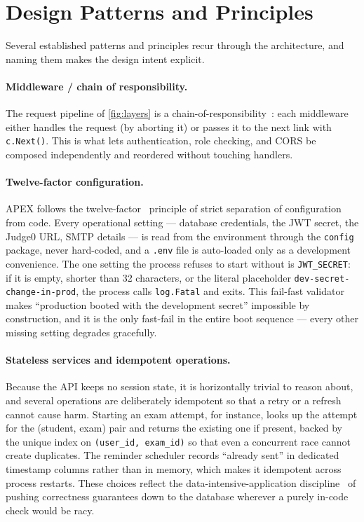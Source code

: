 \section{Design Patterns and Principles}\label{sec:patterns}

Several established patterns and principles recur through the architecture, and
naming them makes the design intent explicit.

\paragraph{Middleware / chain of responsibility.} The request pipeline of
\cref{fig:layers} is a chain-of-responsibility~\cite{fowler2002patterns}: each
middleware either handles the request (by aborting it) or passes it to the next
link with \texttt{c.Next()}. This is what lets authentication, role checking,
and CORS be composed independently and reordered without touching handlers.

\paragraph{Twelve-factor configuration.} APEX follows the
twelve-factor~\cite{twelvefactor} principle of strict separation of
configuration from code. Every operational setting --- database credentials,
the JWT secret, the Judge0 URL, SMTP details --- is read from the environment
through the \texttt{config} package, never hard-coded, and a \texttt{.env} file
is auto-loaded only as a development convenience. The one setting the process
refuses to start without is \texttt{JWT\_SECRET}: if it is empty, shorter than
32 characters, or the literal placeholder \texttt{dev-secret-change-in-prod},
the process calls \texttt{log.Fatal} and exits. This fail-fast validator makes
``production booted with the development secret'' impossible by construction,
and it is the only fast-fail in the entire boot sequence --- every other missing
setting degrades gracefully.

\paragraph{Stateless services and idempotent operations.} Because the API keeps
no session state, it is horizontally trivial to reason about, and several
operations are deliberately idempotent so that a retry or a refresh cannot cause
harm. Starting an exam attempt, for instance, looks up the attempt for the
(student, exam) pair and returns the existing one if present, backed by the
unique index on \texttt{(user\_id, exam\_id)} so that even a concurrent race
cannot create duplicates. The reminder scheduler records ``already sent'' in
dedicated timestamp columns rather than in memory, which makes it idempotent
across process restarts. These choices reflect the data-intensive-application
discipline~\cite{kleppmann2017ddia} of pushing correctness guarantees down to
the database wherever a purely in-code check would be racy.

